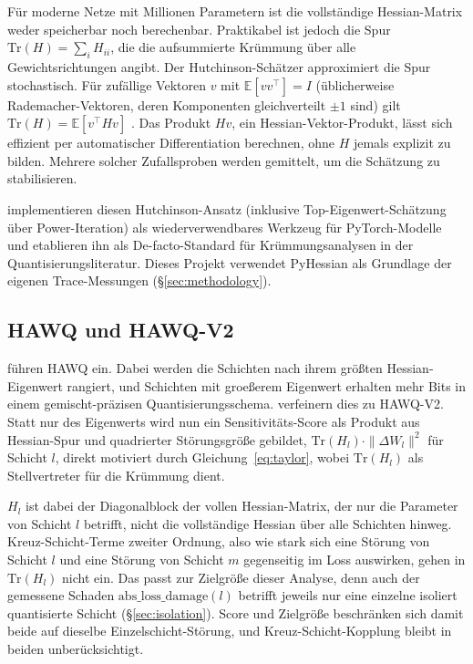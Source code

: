 Für moderne Netze mit Millionen Parametern ist die vollständige Hessian-Matrix weder speicherbar noch berechenbar. Praktikabel ist jedoch die Spur $\mathrm{Tr}(H) = \sum_i H_{ii}$, die die aufsummierte Krümmung über alle Gewichtsrichtungen angibt. Der Hutchinson-Schätzer approximiert die Spur stochastisch. Für zufällige Vektoren $v$ mit $\mathbb{E}[vv^\top] = I$ (üblicherweise Rademacher-Vektoren, deren Komponenten gleichverteilt $\pm 1$ sind) gilt $\mathrm{Tr}(H) = \mathbb{E}[v^\top H v]$ \citep{yao_pyhessian_2020}. Das Produkt $Hv$, ein Hessian-Vektor-Produkt, lässt sich effizient per automatischer Differentiation berechnen, ohne $H$ jemals explizit zu bilden. Mehrere solcher Zufallsproben werden gemittelt, um die Schätzung zu stabilisieren.
\par\medskip

\citet{yao_pyhessian_2020} implementieren diesen Hutchinson-Ansatz (inklusive Top-Eigenwert-Schätzung über Power-Iteration) als wiederverwendbares Werkzeug für PyTorch-Modelle und etablieren ihn als De-facto-Standard für Krümmungsanalysen in der Quantisierungsliteratur. Dieses Projekt verwendet PyHessian als Grundlage der eigenen Trace-Messungen (\S\ref{sec:methodology}).

\subsection{HAWQ und HAWQ-V2}
\label{sec:fund-hawq}

\citet{dong_hawq_2019} führen HAWQ ein. Dabei werden die Schichten nach ihrem größten Hessian-Eigenwert rangiert, und Schichten mit groeßerem Eigenwert erhalten mehr Bits in einem gemischt-präzisen Quantisierungsschema. \citet{dong_hawqv2_2020} verfeinern dies zu HAWQ-V2. Statt nur des Eigenwerts wird nun ein Sensitivitäts-Score als Produkt aus Hessian-Spur und quadrierter Störungsgröße gebildet, $\mathrm{Tr}(H_l)\cdot\|\Delta W_l\|^2$ für Schicht $l$, direkt motiviert durch Gleichung~\eqref{eq:taylor}, wobei $\mathrm{Tr}(H_l)$ als Stellvertreter für die Krümmung dient.
\par\medskip

$H_l$ ist dabei der Diagonalblock der vollen Hessian-Matrix, der nur die Parameter von Schicht $l$ betrifft, nicht die vollständige Hessian über alle Schichten hinweg. Kreuz-Schicht-Terme zweiter Ordnung, also wie stark sich eine Störung von Schicht $l$ und eine Störung von Schicht $m$ gegenseitig im Loss auswirken, gehen in $\mathrm{Tr}(H_l)$ nicht ein. Das passt zur Zielgröße dieser Analyse, denn auch der gemessene Schaden $\mathrm{abs\_loss\_damage}(l)$ betrifft jeweils nur eine einzelne isoliert quantisierte Schicht (\S\ref{sec:isolation}). Score und Zielgröße beschränken sich damit beide auf dieselbe Einzelschicht-Störung, und Kreuz-Schicht-Kopplung bleibt in beiden unberücksichtigt.
\par\medskip

